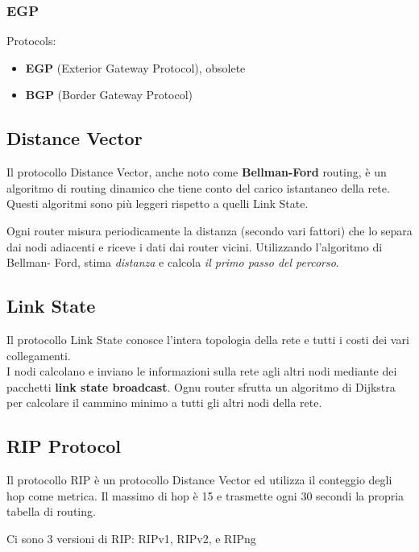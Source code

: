 \documentclass[a4paper]{article}
\begin{document}
\subsubsection{EGP}

Protocols:

\begin{itemize}
    \item \textbf{EGP} (Exterior Gateway Protocol), obsolete
    \item \textbf{BGP} (Border Gateway Protocol)
\end{itemize}

\subsection{Distance Vector}

Il protocollo Distance Vector, anche noto come \textbf{Bellman-Ford} routing, è un
algoritmo di routing dinamico che tiene conto del carico istantaneo della rete.
Questi algoritmi sono più leggeri rispetto a quelli Link State.

Ogni router misura periodicamente la distanza (secondo vari fattori) che lo
separa dai nodi adiacenti e riceve i dati dai router vicini. Utilizzando l'algoritmo di Bellman-
Ford, stima \textit{distanza} e calcola \textit{il primo passo del percorso}.

\subsection{Link State}

Il protocollo Link State conosce l'intera topologia della rete e tutti i costi dei vari collegamenti.
\\
I nodi calcolano e inviano le informazioni sulla rete agli altri nodi mediante dei pacchetti
\textbf{link state broadcast}.
Ognu router sfrutta un algoritmo di Dijkstra per calcolare il cammino minimo a tutti gli altri nodi
della rete.

\subsection{RIP Protocol}

Il protocollo RIP è un protocollo Distance Vector ed utilizza il conteggio degli hop
come metrica. Il massimo di hop è 15 e trasmette ogni 30 secondi la propria tabella di routing.

Ci sono 3 versioni di RIP: RIPv1, RIPv2, e RIPng
\end{document}
